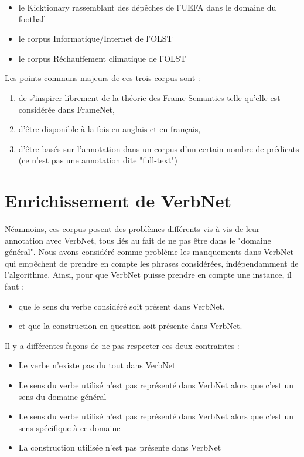 \begin{itemize}
    \item le Kicktionary rassemblant des dépêches de l'UEFA dans le domaine du football
    \item le corpus Informatique/Internet de l'OLST
    \item le corpus Réchauffement climatique de l'OLST
\end{itemize}

Les points communs majeurs de ces trois corpus sont :
\begin{enumerate}
    \item de s'inspirer librement de la théorie des Frame Semantics telle qu'elle est considérée dans FrameNet,
    \item d'être disponible à la fois en anglais et en français,
    \item d'être basés sur l'annotation dans un corpus d'un certain nombre de prédicats (ce n'est pas une annotation dite "full-text")
\end{enumerate}

\section{Enrichissement de VerbNet}

Néanmoins, ces corpus posent des problèmes différents vis-à-vis de leur
annotation avec VerbNet, tous liés au fait de ne pas être dans le "domaine
général". Nous avons considéré comme problème les manquements dans VerbNet qui
empêchent de prendre en compte les phrases considérées, indépendamment de
l'algorithme. Ainsi, pour que VerbNet puisse prendre en compte une instance, il faut :

\begin{itemize}
    \item que le sens du verbe considéré soit présent dans VerbNet,
    \item et que la construction en question soit présente dans VerbNet.
\end{itemize}

Il y a différentes façons de ne pas respecter ces deux contraintes :

\begin{itemize}
    \item Le verbe n'existe pas du tout dans VerbNet
    \item Le sens du verbe utilisé n'est pas représenté dans VerbNet alors que c'est un sens du domaine général
    \item Le sens du verbe utilisé n'est pas représenté dans VerbNet alors que c'est un sens spécifique à ce domaine
    \item La construction utilisée n'est pas présente dans VerbNet
\end{itemize}

